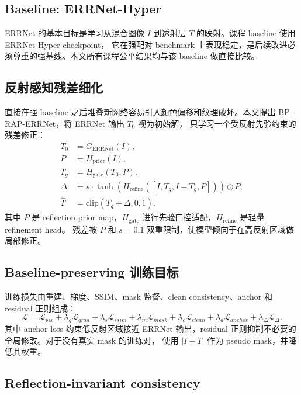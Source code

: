 \documentclass{article}
\newcommand{\method}{BP-RAP}
\begin{document}
\subsection{Baseline: ERRNet-Hyper}

ERRNet 的基本目标是学习从混合图像 $I$ 到透射层 $T$ 的映射。课程 baseline 使用 ERRNet-Hyper checkpoint，
它在强配对 benchmark 上表现稳定，是后续改进必须尊重的强基线。本文所有课程公平结果均与该 baseline 做直接比较。

\subsection{反射感知残差细化}

直接在强 baseline 之后堆叠新网络容易引入颜色偏移和纹理破坏。本文提出 \method{}-ERRNet，将 ERRNet 输出 $T_0$ 视为初始解，
只学习一个受反射先验约束的残差修正：
\begin{align}
T_0 &= G_{\mathrm{ERRNet}}(I),\\
P &= H_{\mathrm{prior}}(I),\\
T_g &= H_{\mathrm{gate}}(T_0, P),\\
\Delta &= s\cdot \tanh(H_{\mathrm{refine}}([I,T_g,I-T_g,P]))\odot P,\\
\hat{T} &= \mathrm{clip}(T_g+\Delta,0,1).
\end{align}
其中 $P$ 是 reflection prior map，$H_{\mathrm{gate}}$ 进行先验门控适配，$H_{\mathrm{refine}}$ 是轻量 refinement head。
残差被 $P$ 和 $s=0.1$ 双重限制，使模型倾向于在高反射区域做局部修正。

\subsection{Baseline-preserving 训练目标}

训练损失由重建、梯度、SSIM、mask 监督、clean consistency、anchor 和 residual 正则组成：
\begin{equation}
\mathcal{L} =
\mathcal{L}_{pix}+\lambda_g\mathcal{L}_{grad}+\lambda_s\mathcal{L}_{ssim}
+\lambda_m\mathcal{L}_{mask}+\lambda_c\mathcal{L}_{clean}
+\lambda_a\mathcal{L}_{anchor}+\lambda_\Delta\mathcal{L}_{\Delta}.
\end{equation}
其中 anchor loss 约束低反射区域接近 ERRNet 输出，residual 正则抑制不必要的全局修改。对于没有真实 mask 的训练对，
使用 $|I-T|$ 作为 pseudo mask，并降低其权重。

\subsection{Reflection-invariant consistency}
\end{document}
